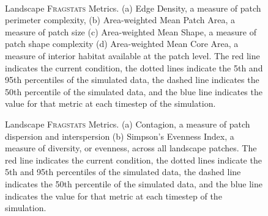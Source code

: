 \begin{figure}[!htbp]
  \centering
   \\
\caption{Landscape \textsc{Fragstats} Metrics. (a) Edge Density, a measure of patch perimeter complexity, (b) Area-weighted Mean Patch Area, a measure of patch size (c) Area-weighted Mean Shape, a measure of patch shape complexity (d) Area-weighted Mean Core Area, a measure of interior habitat available at the patch level. The red line indicates the current condition, the dotted lines indicate the 5th and 95th percentiles of the simulated data, the dashed line indicates the 50th percentile of the simulated data, and the blue line indicates the value for that metric at each timestep of the simulation.}
\label{fig:fragland1}
\end{figure}

\begin{figure}[!htbp]
  \centering
\caption{Landscape \textsc{Fragstats} Metrics. (a) Contagion, a measure of patch dispersion and interspersion (b) Simpson's Evenness Index, a measure of diversity, or evenness, across all landscape patches. The red line indicates the current condition, the dotted lines indicate the 5th and 95th percentiles of the simulated data, the dashed line indicates the 50th percentile of the simulated data, and the blue line indicates the value for that metric at each timestep of the simulation.}
\label{fig:fragland2}
\end{figure}


